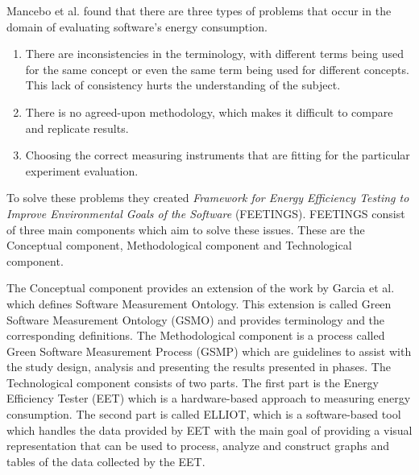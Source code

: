 



Mancebo et al. found that there are three types of problems that occur in the domain of evaluating software's energy consumption.\cite{MANCEBO2021100558} 
\begin{enumerate}
    \item There are inconsistencies in the terminology, with different terms being used for the same concept or even the same term being used for different concepts. This lack of consistency hurts the understanding of the subject.
    \item There is no agreed-upon methodology, which makes it difficult to compare and replicate results.
    \item Choosing the correct measuring instruments that are fitting for the particular experiment evaluation.
\end{enumerate}

To solve these problems they created \textit{Framework for Energy Efficiency Testing to Improve Environmental Goals of the Software} (FEETINGS). FEETINGS consist of three main components which aim to solve these issues. These are the Conceptual component, Methodological component and Technological component.\cite{MANCEBO2021100558}\nytafsnit

%

The Conceptual component provides an extension of the work by Garcia et al.\cite{GARCIA2006631} which defines Software Measurement Ontology. This extension is called Green Software Measurement Ontology (GSMO) and provides terminology and the corresponding definitions. The Methodological component is a process called Green Software Measurement Process (GSMP) which are guidelines to assist with the study design, analysis and presenting the results presented in phases. The Technological component consists of two parts. The first part is the Energy Efficiency Tester (EET) which is a hardware-based approach to measuring energy consumption. The second part is called ELLIOT, which is a software-based tool which handles the data provided by EET with the main goal of providing a visual representation that can be used to process, analyze and construct graphs and tables of the data collected by the EET.\cite{MANCEBO2021100558}


